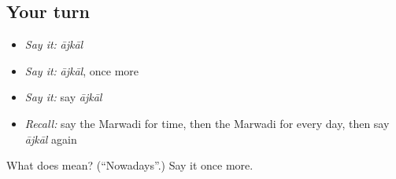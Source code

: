 \subsection*{Your turn}
\begin{itemize}
\raggedright
  \item \emph{Say it:} \emph{ājkāl}
  \item \emph{Say it:} \emph{ājkāl}, once more
  \item \emph{Say it:} say \emph{ājkāl}
  \item \emph{Recall:} say the Marwadi for time, then the Marwadi for every day, then say \emph{ājkāl} again
\end{itemize}

\begin{tcolorbox}[breakable,colback=teal!4,colframe=teal!35!black,title={Before you move on}]
What does  mean? (\textquotedblleft{}Nowadays\textquotedblright{}.) Say it once more.
\end{tcolorbox}
